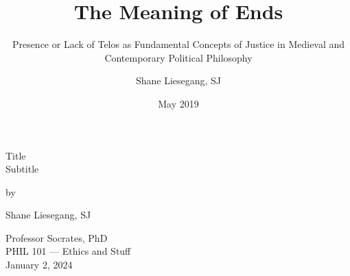 \documentclass[
    12pt,
    letterpaper,
    oneside,
    noraggedright
]{turabian-researchpaper}
\title{The Meaning of Ends}
\subtitle{Presence or Lack of Telos as Fundamental Concepts of Justice in Medieval and Contemporary Political Philosophy}
\author{Shane Liesegang, SJ}
\date{May 2019}
\begin{document}
    \begin{center}

    \thispagestyle{empty}
    \vspace*{1in}
    \begin{singlespace}
    Title \\
    Subtitle
    \end{singlespace}
    \vspace{2in - \baselineskip}

    by
    \vspace{2in - \baselineskip}

    Shane Liesegang, SJ

    \vspace{2in - \baselineskip}

    \begin{singlespace}
        Professor Socrates, PhD \\
        PHIL 101 --- Ethics and Stuff \\
        January 2, 2024
    \end{singlespace}
    \end{center}
    \newpage
    \setcounter{page}{1}
    
\end{document}
